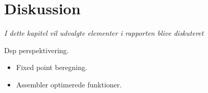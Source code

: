 \chapter{Diskussion}\label{kap:diskussion}
\emph{I dette kapitel vil udvalgte elementer i rapporten blive diskuteret}





Dsp perspektivering.
\begin{itemize}
\item Fixed point beregning.
\item Assembler optimerede funktioner.
\end{itemize}